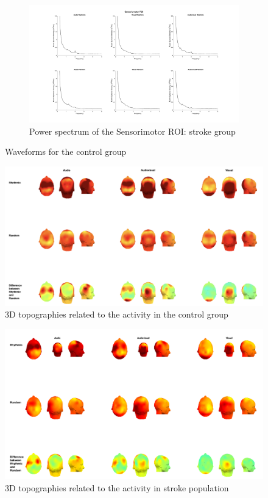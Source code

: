 \begin{figure}[htbp]
\begin{subfigure}[htbp]{0.55\textwidth}
        \includegraphics[width=\textwidth]{stroke_images/sensorimotor_roi.png}
        \caption{Power spectrum of the Sensorimotor ROI: stroke group}
        \label{fig: Waveforms stroke: sensorimotor}   
    \end{subfigure}
    \caption{Waveforms for the control group}
    \label{fig: Waveforms stroke}
\end{figure} 

\begin{figure}[htbp]
        \includegraphics[width=1\textwidth]{healthy_images/3d_topo.png}
        \caption{3D topographies related to the activity in the control group}
        \label{fig: 3D topographies control group} 
\end{figure}
\begin{figure}
    \includegraphics[width=1\textwidth]{stroke_images/3d_topographies.png}
        \caption{3D topographies related to the activity in stroke population}
        \label{fig: 3D topographies stroke group}   
\end{figure}

